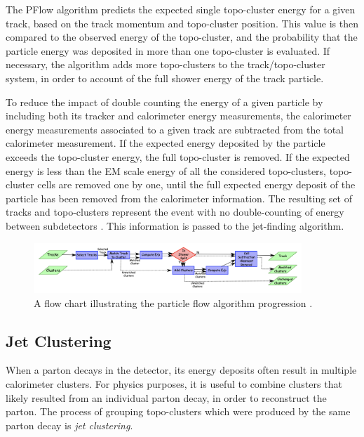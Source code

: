 The PFlow algorithm predicts the expected single topo-cluster energy for a given track, based on the track momentum and topo-cluster position. This value is then compared to the observed energy of the topo-cluster, and the probability that the particle energy was deposited in more than one topo-cluster is evaluated. If necessary, the algorithm adds more topo-clusters to the track/topo-cluster system, in order to account of the full shower energy of the track particle. \par

To reduce the impact of double counting the energy of a given particle by including both its tracker and calorimeter energy measurements, the calorimeter energy measurements associated to a given track are subtracted from the total calorimeter measurement. If the expected energy deposited by the particle exceeds the topo-cluster energy, the full topo-cluster is removed. If the expected energy is less than the EM scale energy of all the considered topo-clusters, topo-cluster cells are removed one by one, until the full expected energy deposit of the particle has been removed from the calorimeter information. The resulting set of tracks and topo-clusters represent the event with no double-counting of energy between subdetectors \cite{pflow}. This information is passed to the jet-finding algorithm.

\begin{figure}[h]
        \centering
	\includegraphics[width=0.9\textwidth]{figures/ch5/pflow_diagram}
	\caption{ A flow chart illustrating the particle flow algorithm progression \cite{pflow}. }
	\label{fig:pflow_diagram}
\end{figure}

\subsection{Jet Clustering}
\label{sec:jet_cluster}
When a parton decays in the detector, its energy deposits often result in multiple calorimeter clusters. For physics purposes, it is useful to combine clusters that likely resulted from an individual parton decay, in order to reconstruct the parton. The process of grouping topo-clusters which were produced by the same parton decay is \textit{jet clustering}. \par

